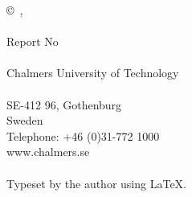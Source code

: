 %
%
%
%
%
%
%
%
%
%
%
%
%
%
%
%
%
%
%
%
%
%
%


\thispagestyle{empty}

\vspace*{9.9 cm}

\noindent\textbf{\thesistitle}\\
\ifdefined \thesissubtitle \if \thesissubtitle\empty\else
    \noindent\footnotesize{\textit{\thesissubtitle}}\\
\fi\fi\\
\normalsize
\MakeUppercase{\thesisauthor}\\
\\
\copyright~{\MakeUppercase{\thesisauthor}},~\thesisyear\\ 
\\
Report No \thesisnumber\\
\\
\noindent Chalmers University of Technology \\
\thesisdepartment \\
SE-412 96, Gothenburg\\
Sweden \\
Telephone: +46 (0)31-772 1000 \\
www.chalmers.se \\
\\
Typeset by the author using \LaTeX.\\


\clearpage
